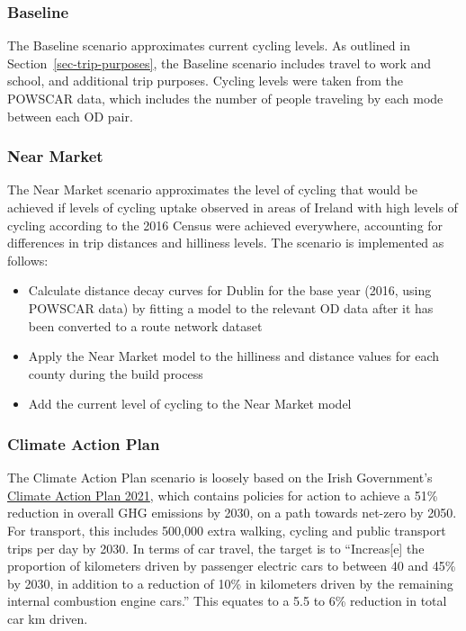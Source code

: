 \documentclass[
  super,
  preprint,
  3p]{elsarticle}
\providecommand{\tightlist}{%
  \setlength{\itemsep}{0pt}\setlength{\parskip}{0pt}}\usepackage{longtable,booktabs,array}
\begin{document}
\subsubsection{Baseline}\label{baseline}

The Baseline scenario approximates current cycling levels. As outlined
in Section~\ref{sec-trip-purposes}, the Baseline scenario includes
travel to work and school, and additional trip purposes. Cycling levels
were taken from the POWSCAR data, which includes the number of people
traveling by each mode between each OD pair.

\subsubsection{Near Market}\label{near-market}

The Near Market scenario approximates the level of cycling that would be
achieved if levels of cycling uptake observed in areas of Ireland with
high levels of cycling according to the 2016 Census were achieved
everywhere, accounting for differences in trip distances and hilliness
levels. The scenario is implemented as follows:

\begin{itemize}
\tightlist
\item
  Calculate distance decay curves for Dublin for the base year (2016,
  using POWSCAR data) by fitting a model to the relevant OD data after
  it has been converted to a route network dataset
\item
  Apply the Near Market model to the hilliness and distance values for
  each county during the build process
\item
  Add the current level of cycling to the Near Market model
\end{itemize}

\subsubsection{Climate Action Plan}\label{climate-action-plan}

The Climate Action Plan scenario is loosely based on the Irish
Government's
\href{https://www.gov.ie/en/publication/6223e-climate-action-plan-2021/}{Climate
Action Plan 2021}, which contains policies for action to achieve a 51\%
reduction in overall GHG emissions by 2030, on a path towards net-zero
by 2050. For transport, this includes 500,000 extra walking, cycling and
public transport trips per day by 2030. In terms of car travel, the
target is to ``Increas{[}e{]} the proportion of kilometers driven by
passenger electric cars to between 40 and 45\% by 2030, in addition to a
reduction of 10\% in kilometers driven by the remaining internal
combustion engine cars.'' This equates to a 5.5 to 6\% reduction in
total car km driven.
\end{document}
